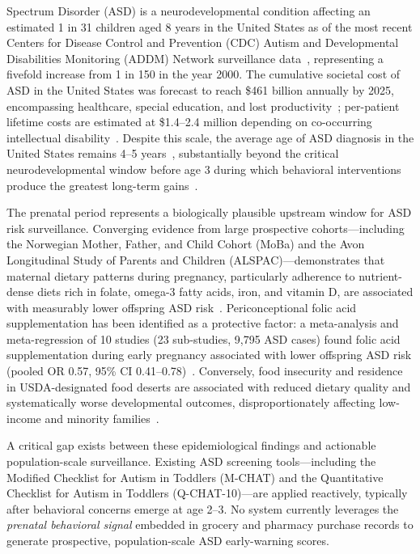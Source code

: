 \documentclass[journal]{IEEEtran}
\begin{document}
 Spectrum Disorder (ASD) is a neurodevelopmental
condition affecting an estimated 1 in 31 children aged 8 years in the
United States as of the most recent Centers for Disease Control and
Prevention (CDC) Autism and Developmental Disabilities Monitoring
(ADDM) Network surveillance data~\cite{cdc2025addm}, representing a
fivefold increase from 1 in 150 in the year 2000. The cumulative
societal cost of ASD in the United States was forecast to reach
\$461 billion annually by 2025, encompassing healthcare, special
education, and lost productivity~\cite{leigh2015forecasting}; per-patient
lifetime costs are estimated at \$1.4--2.4 million depending on
co-occurring intellectual disability~\cite{buescher2014costs}. Despite
this scale, the average
age of ASD diagnosis in the United States remains 4--5 years~\cite{cdc2025addm},
substantially beyond the critical neurodevelopmental window before age
3 during which behavioral interventions produce the greatest long-term
gains~\cite{dawson2010randomized}.

The prenatal period represents a biologically plausible upstream window
for ASD risk surveillance. Converging evidence from large prospective
cohorts---including the Norwegian Mother, Father, and Child Cohort
(MoBa) and the Avon Longitudinal Study of Parents and Children
(ALSPAC)---demonstrates that maternal dietary patterns during pregnancy,
particularly adherence to nutrient-dense diets rich in folate,
omega-3 fatty acids, iron, and vitamin D, are associated with
measurably lower offspring ASD risk~\cite{devilbiss2017prenatal,
lyall2021maternal}. Periconceptional folic acid supplementation has
been identified as a protective factor: a meta-analysis and
meta-regression of 10 studies (23 sub-studies, 9,795 ASD cases) found
folic acid supplementation during early pregnancy associated with
lower offspring ASD risk (pooled OR 0.57, 95\% CI 0.41--0.78)~\cite{liu2021folicacid}.
Conversely, food insecurity and
residence in USDA-designated food deserts are associated with reduced
dietary quality and systematically worse developmental outcomes,
disproportionately affecting low-income and minority
families~\cite{panjwani2021food}.

A critical gap exists between these epidemiological findings and
actionable population-scale surveillance. Existing ASD screening
tools---including the Modified Checklist for Autism in Toddlers
(M-CHAT) and the Quantitative Checklist for Autism in Toddlers
(Q-CHAT-10)---are applied reactively, typically after behavioral
concerns emerge at age 2--3. No system currently leverages the
\textit{prenatal behavioral signal} embedded in grocery and pharmacy
purchase records to generate prospective, population-scale ASD
early-warning scores.
\end{document}
